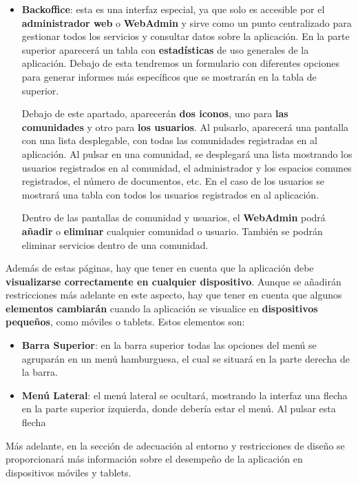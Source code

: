 \begin{appendices}
\begin{itemize}
	\item \textbf{Backoffice}: esta es una interfaz especial, ya que solo es accesible por el \textbf{administrador web} o \textbf{WebAdmin} y sirve como un punto centralizado para gestionar todos los servicios y consultar datos sobre la aplicación.
	En la parte superior aparecerá un tabla con \textbf{estadísticas} de uso generales de la aplicación. Debajo de esta tendremos un formulario con diferentes opciones para generar informes más específicos que se mostrarán en la tabla de superior.
	
	Debajo de este apartado, aparecerán \textbf{dos iconos}, uno para \textbf{las comunidades} y otro para \textbf{los usuarios}. Al pulsarlo, aparecerá una pantalla con una lista desplegable, con todas las comunidades registradas en al aplicación. Al pulsar en una comunidad, se desplegará una lista mostrando los usuarios registrados en al comunidad, el administrador y los espacios comunes registrados, el número de documentos, etc. En el caso de los usuarios se mostrará una tabla con todos los usuarios registrados en al aplicación.
	
	Dentro de las pantallas de comunidad y usuarios, el \textbf{WebAdmin} podrá \textbf{añadir} o \textbf{eliminar} cualquier comunidad o usuario. También se podrán eliminar servicios dentro de una comunidad.
\end{itemize}

Además de estas páginas, hay que tener en cuenta que la aplicación debe \textbf{visualizarse correctamente en cualquier dispositivo}. Aunque se añadirán restricciones más adelante en este aspecto, hay que tener en cuenta que algunos \textbf{elementos cambiarán} cuando la aplicación se visualice en \textbf{dispositivos pequeños}, como móviles o tablets. Estos elementos son:

\begin{itemize}
	\item \textbf{Barra Superior}: en la barra superior todas las opciones del menú se agruparán en un \gls{menú hamburguesa}, el cual se situará en la parte derecha de la barra.
	
	\item \textbf{Menú Lateral}: el menú lateral se ocultará, mostrando la interfaz una flecha en la parte superior izquierda, donde debería estar el menú. Al pulsar esta flecha 
\end{itemize}

Más adelante, en la sección de adecuación al entorno y restricciones de diseño se proporcionará más información sobre el desempeño de la aplicación en dispositivos móviles y tablets.


\end{appendices}
